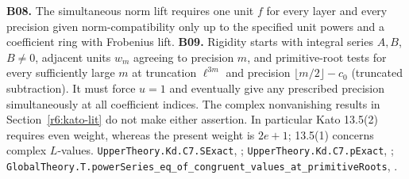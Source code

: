 \textbf{B08.} The simultaneous norm lift requires one unit \(f\)
for every layer and every precision given norm-compatibility only up
to the specified unit powers and a coefficient ring with Frobenius lift.
\textbf{B09.} Rigidity starts with integral series \(A,B\), \(B\ne0\),
adjacent units \(w_m\) agreeing to precision \(m\), and primitive-root
tests for every sufficiently large \(m\) at truncation \(\ell^{3m}\) and
precision \(\lfloor m/2\rfloor-c_0\) (truncated subtraction).
It must force \(u=1\) and eventually give any prescribed precision
simultaneously at all coefficient indices. The complex nonvanishing
results in Section~\ref{r6:kato-lit} do not make either assertion.
In particular Kato 13.5(2) requires even weight, whereas the present weight
is \(2e+1\); 13.5(1) concerns complex \(L\)-values.
\nolinkurl{UpperTheory.Kd.C7.SExact}, ;
\nolinkurl{UpperTheory.Kd.C7.pExact}, ;
\nolinkurl{GlobalTheory.T.powerSeries_eq_of_congruent_values_at_primitiveRoots},
.

